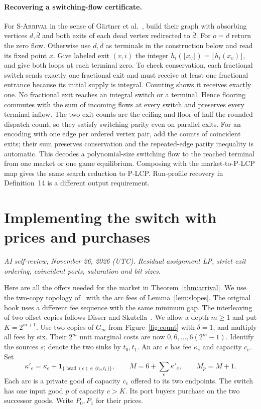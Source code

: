 \documentclass[11pt,oneside,openany,notitlepage]{report}
\newcommand{\reviewdate}{November 26, 2026 (UTC)}
\newcommand{\reviewmark}[1]{\par\nopagebreak[4]\noindent
  {\footnotesize\itshape AI self-review, \reviewdate. #1\par}\nobreak\smallskip}
\begin{document}
\paragraph{Recovering a switching-flow certificate.}
For \textsc{S-Arrival} in the sense of G\"artner et
al.~\cite[Definitions~3 and~13]{ghhkms}, build their graph with
absorbing vertices \(d,\bar d\) and both exits of each dead vertex
redirected to \(\bar d\). For \(o=d\) return the zero flow. Otherwise
use \(d,\bar d\) as terminals in the construction below and read its
fixed point \(x\). Give labeled exit \((v,i)\) the integer
\(h_i(\lfloor x_v\rfloor)=\lfloor h_i(x_v)\rfloor\), and give both
loops at each terminal zero. To check conservation, each fractional
switch sends exactly one fractional exit and must receive at least
one fractional entrance because its initial supply is integral.
Counting shows it receives exactly one. No fractional exit reaches
an integral switch or a terminal. Hence flooring commutes with the
sum of incoming flows at every switch and preserves every terminal
inflow. The two exit counts are the ceiling and floor of half the
rounded dispatch count, so they satisfy switching parity even on
parallel exits. For an encoding with one edge per ordered vertex
pair, add the counts of coincident exits; their sum preserves
conservation and the repeated-edge parity inequality is automatic.
This decodes a polynomial-size switching flow to the
reached terminal from one market or one game equilibrium. Composing
with the market-to-P-LCP map gives the same search reduction to P-LCP.
Run-profile recovery in Definition~14 is a different output requirement.

\section{Implementing the switch with prices and purchases}
\reviewmark{Residual assignment LP, strict exit ordering, coincident ports, saturation and bit sizes.}

Here are all the offers needed for the market in Theorem~\ref{thm:arrival}.
We use the two-copy topology of~\cite[Chapter~4]{book} with the
arc fees of Lemma~\ref{lem:slopes}. The original book uses a different
fee sequence with the same minimum gap. The interleaving of two
offset copies follows Disser and Skutella~\cite[\S3.2]{ds}.
We allow a depth \(m\ge1\) and put \(K=2^{m+1}\). Use two copies of
\(G_m\) from Figure~\ref{fig:count} with \(\delta=1\), and multiply
all fees by six. Their \(2^m\) unit marginal costs are now
\(0,6,\ldots,6(2^m-1)\). Identify the sources \(s\); denote the two
sinks by \(t_0,t_1\). An arc \(e\) has fee \(\kappa_e\) and capacity
\(c_e\). Set
\[
 \kappa'_e=\kappa_e+\mathbf1_{\{\operatorname{head}(e)\in\{t_0,t_1\}\}},
 \qquad M=6+\sum_e\kappa'_e,\qquad M_p=M+1 .
\]
Each arc is a private good of capacity \(c_e\) offered to its two endpoints.
The switch has one input good \(p\) of capacity \(c>K\). Its port buyers
purchase on the two successor goods. Write \(P_0,P_1\) for their prices.
\end{document}
